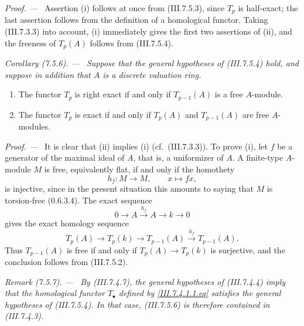 \documentclass[10pt,oneside]{book}
\newcommand{\sref}[2][]{(#2)}
\newcommand{\oldpage}[2][]{\setcounter{footnote}{0}\marginpar{\scriptsize\textbf{#1}~|~#2}\ignorespaces}
\newenvironment{corollary}[1][]{\par\medskip\noindent\itshape Corollary (#1). ---\ }{\par}
\newenvironment{remark}[1][]{\par\medskip\noindent\itshape Remark (#1). ---\ }{\par}
\newenvironment{proof}{\par\medskip\noindent\textit{Proof. ---\ }}{\par}
\begin{document}
\begin{proof}
Assertion (i) follows at once from \sref{III.7.5.3}, since
$T_p$ is half-exact; the last assertion follows from the
definition of a homological functor.  Taking
\sref{III.7.3.3} into account, (i) immediately gives the first
two assertions of (ii), and the freeness of $T_p(A)$ follows
from \sref{III.7.5.4}.
\end{proof}

\begin{corollary}[7.5.6]
\label{III.7.5.6}
Suppose that the general hypotheses of \sref{III.7.5.4} hold,
and suppose in addition that $A$ is a discrete valuation
ring.
\begin{enumerate}
  \item[(i)] The functor $T_p$ is right exact if and only if
    $T_{p-1}(A)$ is a free $A$-module.
  \item[(ii)] The functor $T_p$ is exact if and only if
    $T_p(A)$ and $T_{p-1}(A)$ are free $A$-modules.
\end{enumerate}
\end{corollary}

\oldpage[III]{192}
\begin{proof}
It is clear that (ii) implies (i) (cf.\
\sref{III.7.3.3}).  To prove (i), let $f$ be a generator of
the maximal ideal of $A$, that is, a uniformizer of $A$.  A
finite-type $A$-module $M$ is free, equivalently flat, if and
only if the homothety
\[
  h_f:M\longrightarrow M,\qquad x\longmapsto fx,
\]
is injective, since in the present situation this amounts to
saying that $M$ is torsion-free \sref[0]{0.6.3.4}.  The exact
sequence
\[
  0
  \longrightarrow A
  \xrightarrow{h_f}
  A
  \longrightarrow k
  \longrightarrow 0
\]
gives the exact homology sequence
\[
  T_p(A)
  \longrightarrow T_p(k)
  \longrightarrow T_{p-1}(A)
  \xrightarrow{h_f}
  T_{p-1}(A).
\]
Thus $T_{p-1}(A)$ is free if and only if
$T_p(A)\to T_p(k)$ is surjective, and the conclusion follows
from \sref{III.7.5.2}.
\end{proof}

\begin{remark}[7.5.7]
\label{III.7.5.7}
By \sref{III.7.4.7}, the general hypotheses of
\sref{III.7.4.4} imply that the homological functor
$T_\bullet$ defined by \eqref{III.7.4.1.1.eq} satisfies the
general hypotheses of \sref{III.7.5.4}.  In that case,
\sref{III.7.5.6} is therefore contained in
\sref{III.7.4.3}.
\end{remark}

\end{document}
